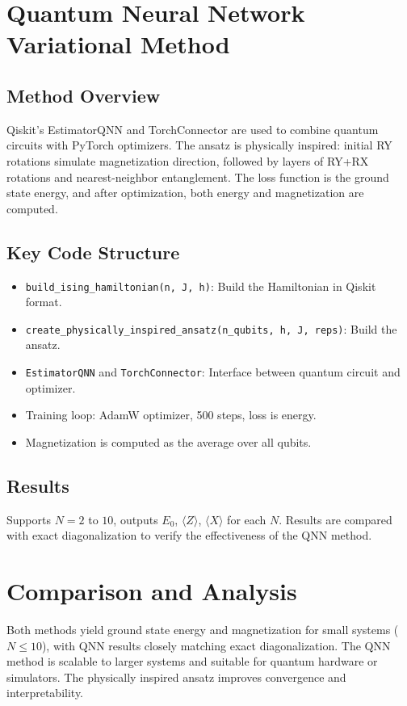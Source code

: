 \section{Quantum Neural Network Variational Method}
\subsection{Method Overview}
Qiskit's EstimatorQNN and TorchConnector are used to combine quantum circuits with PyTorch optimizers. The ansatz is physically inspired: initial RY rotations simulate magnetization direction, followed by layers of RY+RX rotations and nearest-neighbor entanglement. The loss function is the ground state energy, and after optimization, both energy and magnetization are computed.

\subsection{Key Code Structure}
\begin{itemize}
    \item \texttt{build\_ising\_hamiltonian(n, J, h)}: Build the Hamiltonian in Qiskit format.
    \item \texttt{create\_physically\_inspired\_ansatz(n\_qubits, h, J, reps)}: Build the ansatz.
    \item \texttt{EstimatorQNN} and \texttt{TorchConnector}: Interface between quantum circuit and optimizer.
    \item Training loop: AdamW optimizer, 500 steps, loss is energy.
    \item Magnetization is computed as the average over all qubits.
\end{itemize}

\subsection{Results}
Supports $N=2$ to $10$, outputs $E_0$, $\langle Z \rangle$, $\langle X \rangle$ for each $N$. Results are compared with exact diagonalization to verify the effectiveness of the QNN method.

\section{Comparison and Analysis}
Both methods yield ground state energy and magnetization for small systems ($N\leq10$), with QNN results closely matching exact diagonalization. The QNN method is scalable to larger systems and suitable for quantum hardware or simulators. The physically inspired ansatz improves convergence and interpretability.

